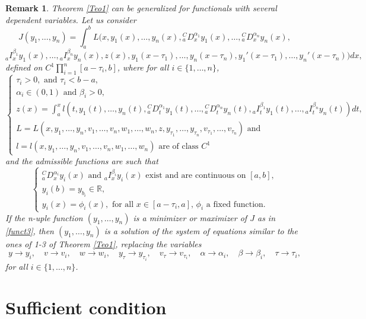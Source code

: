 \documentclass[10pt]{article}
\newtheorem{remark}[theorem]{Remark}
\begin{document}
\begin{remark} Theorem \ref{Teo1} can be generalized for functionals with several dependent variables. Let us consider
\begin{equation}
\label{funct3}
J(y_1,\ldots,y_n)=\int_a^b L(x,y_1(x),\ldots,y_n(x),{^C_aD_x^{\alpha_1}}y_1(x),\ldots,{^C_aD_x^{\alpha_n}}y_n(x),\end{equation}
$${_aI_x^{\beta_1}}y_1(x),\ldots,{_aI_x^{\beta_n}}y_n(x),z(x), y_1(x-\tau_1),\ldots,y_n(x-\tau_n), y_1'(x-\tau_1),\ldots, y_n'(x-\tau_n))dx,$$
defined on $C^1 \prod^{n}_{i=1} [a-\tau_i,b]$, where for all $i\in\{1,\ldots,n\}$,
$$\left\{
\begin{array}{l}
\tau_i>0, \mbox{ and } \tau_i<b-a,\\
\alpha_i\in(0,1) \mbox{ and }\beta_i>0,\\
z(x)=\int_a^x l(t,y_1(t),\ldots,y_n(t),{^C_aD_t^{\alpha_1}}y_1(t),\ldots,{^C_aD_t^{\alpha_n}}y_n(t),{_aI_t^{\beta_1}}y_1(t),\ldots,{_aI_t^{\beta_n}}y_n(t))dt,\\
L=L(x,y_1,\ldots,y_n,v_1,\ldots,v_n,w_1,\ldots,w_n,z,y_{\tau_1},\ldots,y_{\tau_n},v_{\tau_1},\ldots,v_{\tau_n}) \mbox{ and } \\
l=l(x,y_1,\ldots,y_n,v_1,\ldots,v_n,w_1,\ldots,w_n) \mbox{ are of class } C^1
\end{array}\right.$$
and the admissible functions are such that
$$\left\{
\begin{array}{l}
{^C_aD_x^{\alpha_i}}y_i(x) \mbox{ and } {_aI_x^{\beta_i}}y_i(x) \mbox{ exist and are continuous on } [a,b],\\
y_i(b)=y_{b_i}\in \mathbb R,\\
y_i(x)=\phi_i(x), \mbox{ for all } x\in [a-\tau_i,a], \, \phi_i \mbox{ a fixed function.}
\end{array}\right.$$
If the \textit{n}-uple function $(y_1,\ldots,y_n)$ is a minimizer or maximizer of $J$ as in \eqref{funct3},
then $(y_1,\ldots,y_n)$ is a solution of the system of equations similar to the ones of \textit{1-3} of Theorem \ref{Teo1}, replacing the variables
$$y\to y_i,\quad v\to v_i,\quad w\to w_i,\quad y_\tau\to y_{\tau_i},\quad v_\tau\to v_{\tau_i},\quad \alpha\to\alpha_i,\quad \beta\to\beta_i,\quad\tau\to\tau_i,$$
for all $i\in\{1,\dots,n\}$.
\end{remark}



\section{Sufficient condition}\label{sec:SufConditions}
\end{document}
